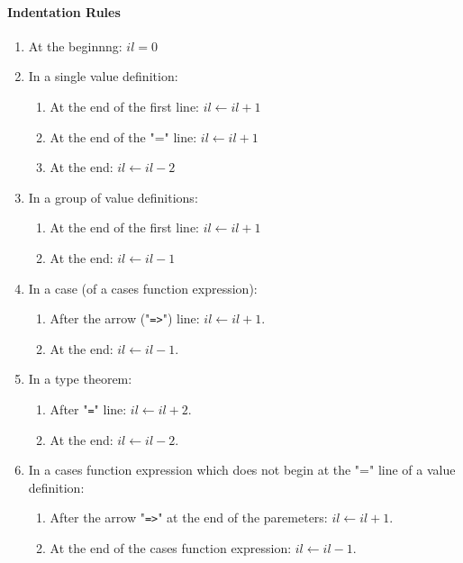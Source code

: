 \documentclass{article}
\begin{document}
\paragraph{Indentation Rules}
\begin{enumerate}

\item
At the beginnng: $il = 0$

\item
In a single value definition:
  \begin{enumerate}

  \item
  At the end of the first line: $il \leftarrow il + 1$

  \item
  At the end of the "=" line: $il \leftarrow il + 1$

  \item
  At the end: $il \leftarrow il - 2$
  \end{enumerate}

\item
In a group of value definitions:
  \begin{enumerate}

  \item
  At the end of the first line: $il \leftarrow il + 1$

  \item
  At the end: $il \leftarrow il - 1$
  \end{enumerate}

\item
In a case (of a cases function expression):
  \begin{enumerate}

  \item
  After the arrow ("\texttt{=>}") line: $il \leftarrow il + 1$.

  \item
  At the end: $il \leftarrow il - 1$.
  \end{enumerate}

\item
In a type theorem:
  \begin{enumerate}

  \item
  After "\texttt{=}" line: $il \leftarrow il + 2$.

  \item
  At the end: $il \leftarrow il - 2$.
  \end{enumerate}

\item
In a cases function expression which does not begin at the "=" line of a value
definition:
  \begin{enumerate}

  \item
  After the arrow "\texttt{=>}" at the end of the paremeters: $il \leftarrow il
  + 1$.

  \item
  At the end of the cases function expression: $il \leftarrow il - 1$.

  \end{enumerate}

\end{enumerate}
\end{document}

